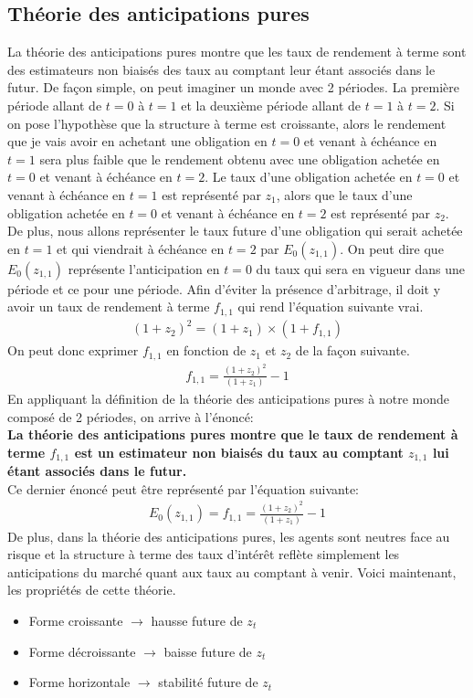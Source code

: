 \documentclass[letterpaper, 12pt]{article}
\newcommand{\1}{\mathds{1}}	%
\theoremstyle{definition}
\begin{document}
\subsection{Théorie des anticipations pures}
La théorie des anticipations pures montre que les taux de rendement à terme sont des estimateurs non biaisés des taux au comptant leur étant associés dans le futur.  De façon simple, on peut imaginer un monde avec 2 périodes. La première période allant de $t=0$ à $t=1$ et la deuxième période allant de $t=1$ à $t=2$.  Si on pose l'hypothèse que la structure à terme est croissante,  alors le rendement que je vais avoir en achetant une obligation en $t=0$ et venant à échéance en $t=1$ sera plus faible que le rendement obtenu avec une obligation achetée en $t=0$ et venant à échéance en $t=2$.  Le taux d'une obligation achetée en $t=0$ et venant à échéance en $t=1$ est représenté par $z_{1}$,  alors que le taux d'une obligation achetée en $t=0$ et venant à échéance en $t=2$ est représenté par $z_{2}$.  De plus, nous allons représenter le taux future d'une obligation qui serait achetée en $t=1$ et qui viendrait à échéance en $t=2$ par $E_0(z_{1,1})$.  On peut dire que $E_0(z_{1,1})$ représente l'anticipation en $t=0$ du taux qui sera en vigueur dans une période et ce pour une période.  Afin d'éviter la présence d'arbitrage, il doit y avoir un taux de rendement à terme $f_{1,1}$ qui rend l'équation suivante vrai.
\begin{align*}
(1+z_2)^2=(1+z_1) \times (1+f_{1,1})
\end{align*}
On peut donc exprimer $f_{1,1}$ en fonction de $z_1$ et $z_2$ de la façon suivante.
\begin{align*}
f_{1,1}=\frac{(1+z_2)^2}{(1+z_1)}-1
\end{align*}
En appliquant la définition de la théorie des anticipations pures à notre monde composé de 2 périodes, on arrive à l'énoncé: \\
 \textbf{La théorie des anticipations pures montre que le taux de rendement à terme $f_{1,1}$ est un estimateur non biaisés du taux au comptant $z_{1,1}$ lui étant associés dans le futur. }\\
Ce dernier énoncé peut être représenté par l'équation suivante:
\begin{align*}
E_0(z_{1,1})=f_{1,1}=\frac{(1+z_2)^2}{(1+z_1)}-1
\end{align*}
\newpage
De plus,  dans la théorie des anticipations pures, les agents sont neutres face au risque et la structure à terme des taux d’intérêt reflète simplement les anticipations du marché quant aux taux au comptant à venir.  Voici maintenant,  les propriétés de cette théorie.
\begin{itemize}
\item  Forme croissante $\rightarrow$ hausse future de $z_t$
\item Forme décroissante $\rightarrow$ baisse future de $z_t$
\item Forme horizontale $\rightarrow$ stabilité future de $z_t$
\end{itemize}
\end{document}
